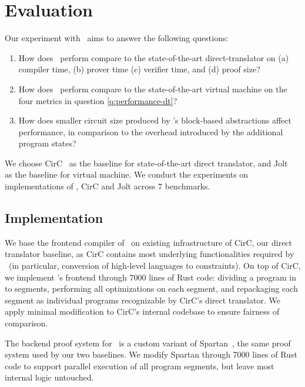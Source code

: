 \section{Evaluation}\label{sec:eval}

Our experiment with \CoBBl~aims to answer the following questions:
\begin{enumerate}
  \item How does \CoBBl~perform compare to the state-of-the-art direct-translator on (a) compiler time, (b) prover time (c) verifier time, and (d) proof size?\label{q:performance-dt}
  \item How does \CoBBl~perform compare to the state-of-the-art virtual machine on the four metrics in question \ref{q:performance-dt}?\label{q:performance-vm}
  \item How does smaller circuit size produced by \CoBBl's block-based abstractions affect performance, in comparison to the overhead introduced by the additional program states?\label{q:tradeoff}
\end{enumerate}

We choose CirC~\cite{ozdemir20circ} as the baseline for state-of-the-art direct translator, and Jolt~\cite{arun23jolt} as the baseline for virtual machine.  We conduct the experiments on implementations of \CoBBl, CirC and Jolt across 7 benchmarks.

\subsection{Implementation}
 We base the frontend compiler of \CoBBl~on existing infrastructure of CirC, our direct translator baseline, as CirC contains most underlying functionalities required by \CoBBl~(in particular, conversion of high-level languages to constraints). On top of CirC, we implement \CoBBl's frontend through 7000 lines of Rust code: dividing a program in to segments, performing all optimizations on each segment, and repackaging each segment as individual programs recognizable by CirC's direct translator. We apply minimal modification to CirC's internal codebase to ensure fairness of comparison.

The backend proof system for \CoBBl~is a custom variant of Spartan~\cite{setty19spartan}, the same proof system used by our two baselines. We modify Spartan through 7000 lines of Rust code to support parallel execution of all program segments, but leave most internal logic untouched.

